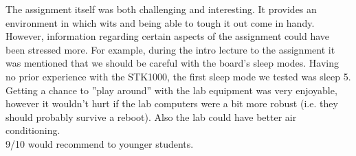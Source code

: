 The assignment itself was both challenging and interesting.
It provides an environment in which wits and being able to tough it out come in handy.
However, information regarding certain aspects of the assignment could have been stressed more.
For example, during the intro lecture to the assignment\cite{lab-intro-lecture} it was mentioned that we should be careful with the board's sleep modes.
Having no prior experience with the STK1000, the first sleep mode we tested was sleep 5.
\\
Getting a chance to ''play around'' with the lab equipment was very enjoyable, however it wouldn't hurt if the lab computers were a bit more robust (i.e. they should probably survive a reboot).
Also the lab could have better air conditioning.
\\
9/10 would recommend to younger students.
